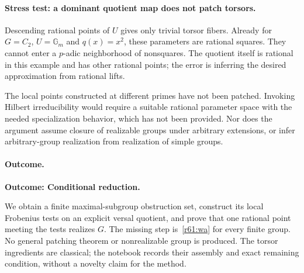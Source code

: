\documentclass[11pt,a4paper]{article}
\numberwithin{equation}{section}
\begin{document}
\paragraph{Stress test: a dominant quotient map does not patch torsors.}
Descending rational points of $U$ gives only trivial torsor fibers. Already for $G=C_2$, $U=\mathbb G_m$ and $q(x)=x^2$, these parameters are rational squares. They cannot enter a $p$-adic neighborhood of nonsquares. The quotient itself is rational in this example and has other rational points; the error is inferring the desired approximation from rational lifts.

The local points constructed at different primes have not been patched. Invoking Hilbert irreducibility would require a suitable rational parameter space with the needed specialization behavior, which has not been provided. Nor does the argument assume closure of realizable groups under arbitrary extensions, or infer arbitrary-group realization from realization of simple groups.

\paragraph{Outcome.}
\textbf{Outcome: Conditional reduction.}

We obtain a finite maximal-subgroup obstruction set, construct its local Frobenius tests on an explicit versal quotient, and prove that one rational point meeting the tests realizes $G$. The missing step is~\eqref{r61:wa} for every finite group. No general patching theorem or nonrealizable group is produced. The torsor ingredients are classical; the notebook records their assembly and exact remaining condition, without a novelty claim for the method.

\end{document}
